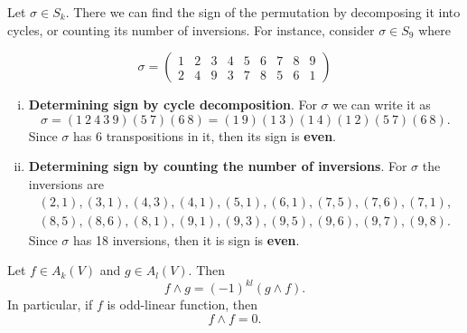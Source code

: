\begin{summary}
	Let $ \sigma \in S_k $. There we can find the sign of the permutation by decomposing it into cycles, or counting its number of inversions. For instance, consider $ \sigma \in S_9 $ where

	\[
	\sigma = \begin{pmatrix}
		1 & 2 & 3 & 4 & 5 & 6 & 7 & 8 & 9 \\
		2 & 4 & 9 & 3 & 7 & 8 & 5 & 6 & 1
	\end{pmatrix}
	\]
	\begin{enumerate}[(i)]
		\item \textbf{Determining sign by cycle decomposition}. For $ \sigma $ we can write it as
		\[ \sigma = (1\ 2\ 4\ 3\ 9 )(5\ 7)(6\ 8) = (1\ 9)(1\ 3)(1\ 4)(1\ 2)(5\ 7)(6\ 8). \]
		Since $ \sigma $ has 6 transpositions in it, then its sign is \textbf{even}.
		\item \textbf{Determining sign by counting the number of inversions}. For $ \sigma $ the inversions are
		\begin{align*}
			(2,1),(3,1),(4,3),(4,1),(5,1),(6,1),(7,5),(7,6),(7,1),\\
			(8,5),(8,6),(8,1),(9,1),(9,3),(9,5),(9,6),(9,7),(9,8).
		\end{align*}
		Since $ \sigma $ has 18 inversions, then it is sign is \textbf{even}.

	\end{enumerate}
\end{summary}

\begin{summary}
	Let $ f \in A_k(V) $ and $ g \in A_l(V) $. Then
	\[ f\wedge g = (-1)^{kl}(g\wedge f). \]
	In particular, if $ f $ is odd-linear function, then 
	\[ f \wedge f = 0. \]
\end{summary}


